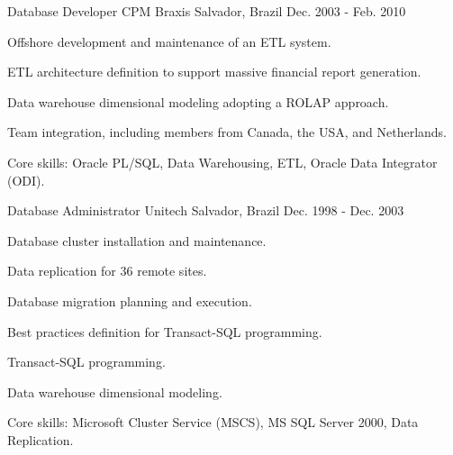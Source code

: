 \begin{cventries}
\cventry
{Database Developer} %
{CPM Braxis} %
{Salvador, Brazil} %
{Dec. 2003 - Feb. 2010} %
{ %
\begin{cvitems}
\item{Offshore development and maintenance of an ETL system.} 
\item{ETL architecture definition to support massive financial report generation.} 
\item{Data warehouse dimensional modeling adopting a ROLAP approach.}
\item{Team integration, including members from Canada, the USA, and Netherlands.}
\item{Core skills: Oracle PL/SQL, Data Warehousing, ETL, Oracle Data Integrator (ODI).}
\end{cvitems}
}


\cventry
{Database Administrator} %
{Unitech} %
{Salvador, Brazil} %
{Dec. 1998 - Dec. 2003} %
{ %
\begin{cvitems}
	\item{Database cluster installation and maintenance.}
	\item{Data replication for 36 remote sites.} 
	\item{Database migration planning and execution.}
	\item{Best practices definition for Transact-SQL programming.}
	\item{Transact-SQL programming.}
	\item{Data warehouse dimensional modeling.}
	\item{Core skills: Microsoft Cluster Service (MSCS), MS SQL Server 2000, Data Replication.}
\end{cvitems}
}


\end{cventries}